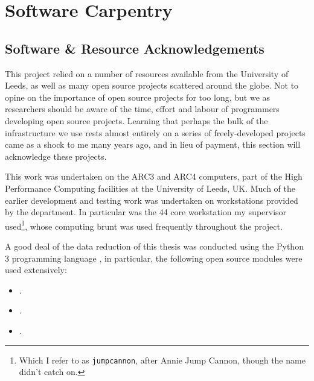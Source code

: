 \chapter{Software Carpentry}

\section{Software \& Resource Acknowledgements}

This project relied on a number of resources available from the University of Leeds, as well as many open source projects scattered around the globe.
Not to opine on the importance of open source projects for too long, but we as researchers should be aware of the time, effort and labour of programmers developing open source projects.
Learning that perhaps the bulk of the infrastructure we use rests almost entirely on a series of freely-developed projects came as a shock to me many years ago, and in lieu of payment, this section will acknowledge these projects.

This work was undertaken on the ARC3 and ARC4 computers, part of the High Performance Computing facilities at the University of Leeds, UK.
Much of the earlier development and testing work was undertaken on workstations provided by the department.
In particular was the 44 core workstation my supervisor used\footnote{Which I refer to as \texttt{jumpcannon}, after Annie Jump Cannon, though the name didn't catch on.}, whose computing brunt was used frequently throughout the project.

A good deal of the data reduction of this thesis was conducted using the Python 3 programming language \parencite{10.5555/1593511}, in particular, the following open source modules were used extensively:

\begin{itemize}
  \item {} \parencite{harris2020array}.
  \item {} \parencite{astropy:2013,astropy:2018}.
  \item {} \parencite{Hunter:2007}.
\end{itemize}


